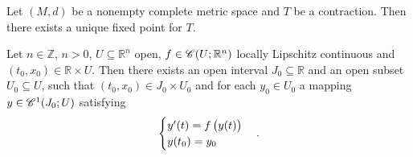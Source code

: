 \begin{lemma}
Let $(M,d)$ be a nonempty complete metric space and $T$ be a contraction. Then there exists a unique fixed point for $T$.
\label{lem:contraction}
\end{lemma}

\begin{theorem}
Let $n \in \mathbb{Z}$, $n > 0$, $U \subseteq \mathbb{R}^n$ open, $f \in \mathscr{C}(U;\mathbb{R}^n)$ locally Lipschitz continuous and $(t_0,x_0) \in \mathbb{R} \times U$. Then there exists an open interval $J_0 \subseteq \mathbb{R}$ and an open subset $U_0 \subseteq U$, such that $(t_0,x_0) \in J_0 \times U_0$ and for each $y_0 \in U_0$ a mapping $y \in \mathscr{C}^1(J_0;U)$ satisfying
\begin{equation}
\begin{cases}
y'(t) = f\del[1]{y(t)}\\
y(t_0) = y_0
\end{cases}.
\end{equation}
\end{theorem}


